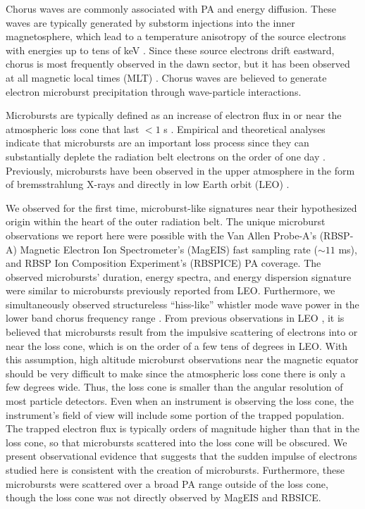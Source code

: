 Chorus waves are commonly associated with PA and energy diffusion. These waves are typically generated by substorm injections into the inner magnetosphere, which lead to a temperature anisotropy of the source electrons with energies up to tens of keV \citep[e.g.][]{Horne2003b, Li2009b}. Since these source electrons drift eastward, chorus is most frequently observed in the dawn sector, but it has been observed at all magnetic local times (MLT) \citep{Li2009}. Chorus waves are believed to generate electron microburst precipitation through wave-particle interactions.

Microbursts are typically defined as an increase of electron flux in or near the atmospheric loss cone that last $< 1$ s \citep[e.g.][]{Anderson1964, Blake1996, Lorentzen2001a}. Empirical and theoretical analyses indicate that microbursts are an important loss process since they can substantially deplete the radiation belt electrons on the order of one day \citep[e.g.][]{Lorentzen2001b, O'Brien2004, Thorne2005, Breneman2017}. Previously, microbursts have been observed in the upper atmosphere in the form of bremsstrahlung X-rays \citep[e.g.][]{Parks1967, Woodger2015, Anderson2017} and directly in low Earth orbit (LEO) \citep[e.g.][]{Nakamura1995, Nakamura2000, Blake1996, Lorentzen2001a, Lorentzen2001b, O'Brien2003, O'Brien2004, Lee2005, Lee2012, Blum2015, Crew2016, Breneman2017, Mozer2018}.
 
We observed for the first time, microburst-like signatures near their hypothesized origin within the heart of the outer radiation belt. The unique microburst observations we report here were possible with the Van Allen Probe-A's (RBSP-A) Magnetic Electron Ion Spectrometer's (MagEIS) fast sampling rate (${\sim} 11$ ms), and RBSP Ion Composition Experiment's (RBSPICE) PA coverage. The observed microbursts' duration, energy spectra, and energy dispersion signature were similar to microbursts previously reported from LEO. Furthermore, we simultaneously observed structureless ``hiss-like'' whistler mode wave power in the lower band chorus frequency range \citep{Li2012}. From previous observations in LEO \citep[e.g.][]{Blake1996}, it is believed that microbursts result from the impulsive scattering of electrons into or near the loss cone, which is on the order of a few tens of degrees in LEO. With this assumption, high altitude microburst observations near the magnetic equator should be very difficult to make since the atmospheric loss cone there is only a few degrees wide. Thus, the loss cone is smaller than the angular resolution of most particle detectors. Even when an instrument is observing the loss cone, the instrument's field of view will include some portion of the trapped population. The trapped electron flux is typically orders of magnitude higher than that in the loss cone, so that microbursts scattered into the loss cone will be obscured. We present observational evidence that suggests that the sudden impulse of electrons studied here is consistent with the creation of microbursts. Furthermore, these microbursts were scattered over a broad PA range outside of the loss cone, though the loss cone was not directly observed by MagEIS and RBSICE.

